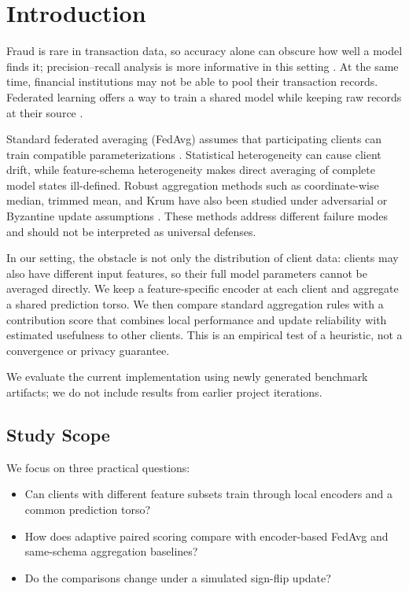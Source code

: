 \documentclass{ieeeaccess}
\begin{document}
\section{Introduction}
Fraud is rare in transaction data, so accuracy alone can obscure how well a
model finds it; precision--recall analysis is more informative in this
setting \cite{saito2015}. At the same time, financial institutions may not be
able to pool their transaction records. Federated learning offers a way to
train a shared model while keeping raw records at their source
\cite{mcmahan2017}.

Standard federated averaging (FedAvg) assumes that participating clients can
train compatible parameterizations \cite{mcmahan2017}. Statistical
heterogeneity can cause client drift, while feature-schema heterogeneity makes
direct averaging of complete model states ill-defined. Robust aggregation
methods such as coordinate-wise median, trimmed mean, and Krum have also been
studied under adversarial or Byzantine update assumptions
\cite{yin2018,blanchard2017}. These methods address different failure modes
and should not be interpreted as universal defenses.

In our setting, the obstacle is not only the distribution of client data: clients may
also have different input features, so their full model parameters cannot be
averaged directly. We keep a feature-specific encoder at each client and
aggregate a shared prediction torso. We then compare standard aggregation
rules with a contribution score that combines local performance and update
reliability with estimated usefulness to other clients. This is an empirical
test of a heuristic, not a convergence or privacy guarantee.

We evaluate the current implementation using newly generated benchmark
artifacts; we do not include results from earlier project iterations.

\subsection{Study Scope}
We focus on three practical questions:
\begin{itemize}
  \item Can clients with different feature subsets train through local
  encoders and a common prediction torso?
  \item How does adaptive paired scoring compare with encoder-based FedAvg
  and same-schema aggregation baselines?
  \item Do the comparisons change under a simulated sign-flip update?
\end{itemize}
\end{document}
